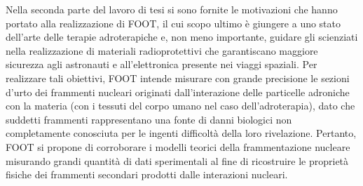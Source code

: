 \documentclass[12pt,a4paper,twoside]{report}
\begin{document}
	Nella seconda parte del lavoro di tesi si sono fornite le motivazioni che hanno portato alla realizzazione di FOOT, il cui scopo ultimo è giungere a uno stato dell'arte delle terapie adroterapiche e, non meno importante, guidare gli scienziati nella realizzazione di materiali radioprotettivi che garantiscano maggiore sicurezza agli astronauti e all'elettronica presente nei viaggi spaziali. Per realizzare tali obiettivi, FOOT intende misurare con grande precisione le sezioni d'urto dei frammenti nucleari originati dall'interazione delle particelle adroniche con la materia (con i tessuti del corpo umano nel caso dell'adroterapia), dato che suddetti frammenti rappresentano una fonte di danni biologici non completamente conosciuta per le ingenti difficoltà della loro rivelazione. Pertanto, FOOT si propone di corroborare i modelli teorici della frammentazione nucleare misurando grandi quantità di dati sperimentali al fine di ricostruire le proprietà fisiche dei frammenti secondari prodotti dalle interazioni nucleari.
	
\end{document}
